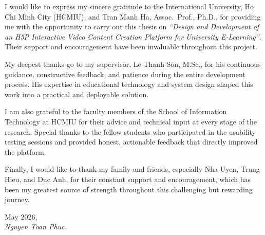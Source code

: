 I would like to express my sincere gratitude to the International University, Ho Chi Minh City
(HCMIU), and Tran Manh Ha, Assoc.\ Prof., Ph.D., for providing me with the opportunity to
carry out this thesis on \textit{``Design and Development of an H5P Interactive Video Content
Creation Platform for University E-Learning''}. Their support and encouragement have
been invaluable throughout this project.

My deepest thanks go to my supervisor, Le Thanh Son, M.Sc., for his continuous guidance,
constructive feedback, and patience during the entire development process. His expertise in
educational technology and system design shaped this work into a practical and deployable
solution.

I am also grateful to the faculty members of the School of Information Technology at HCMIU
for their advice and technical input at every stage of the research. Special thanks to the
fellow students who participated in the usability testing sessions and provided honest,
actionable feedback that directly improved the platform.

Finally, I would like to thank my family and friends, especially Nha Uyen, Trung Hieu, and Duc Anh, for their constant support and encouragement, which
has been my greatest source of strength throughout this challenging but rewarding journey.

\bigskip
\noindent
May 2026, \\
\textit{Nguyen Toan Phuc.}
